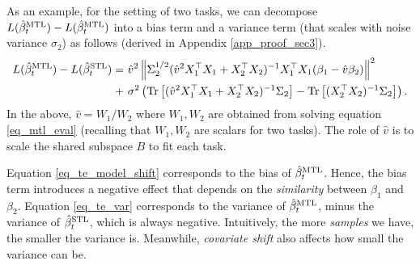 As an example, for the setting of two tasks, we can decompose $L(\hat{\beta}_t^{\text{MTL}}) - L(\hat{\beta}_t^{\text{MTL}})$ into a bias term and a variance term (that scales with noise variance $\sigma_2$) as follows (derived in Appendix \ref{app_proof_sec3}).
{\small\begin{align}
	L(\hat{\beta}_t^{\text{MTL}}) - L(\hat{\beta}_t^{\text{STL}}) =& ~ \hat{v}^2 \left\| \Sigma_2^{1/2} (\hat{v}^2 X_1^{\top}X_1 + X_2^{\top}X_2)^{-1}X_1^{\top}X_1 (\beta_1 - \hat{v}\beta_2) \right\|^2 \label{eq_te_model_shift} \\
	+&~ \sigma^2 \left({\operatorname{Tr}\left[(\hat{v}^2 X_1^{\top}X_1 + X_2^{\top}X_2)^{-1}\Sigma_2\right] - \operatorname{Tr}\left[(X_2^{\top}X_2)^{-1}\Sigma_2\right]}\right). \label{eq_te_var}
\end{align}}%
In the above, $\hat{v} = W_1 / W_2$ where $W_1, W_2$ are obtained from solving equation \eqref{eq_mtl_eval} (recalling that $W_1, W_2$ are scalars for two tasks).
The role of $\hat{v}$ is to scale the shared subspace $B$ to fit each task.

Equation \eqref{eq_te_model_shift} corresponds to the bias of $\hat{\beta}_t^{\text{MTL}}$.
Hence, the bias term introduces a negative effect that depends on the \textit{similarity} between $\beta_1$ and $\beta_2$.
Equation \eqref{eq_te_var} corresponds to the variance of $\hat{\beta}_t^{\text{MTL}}$, minus the variance of $\hat{\beta}_t^{\text{STL}}$, which is always negative.
Intuitively, the more \textit{samples} we have, the smaller the variance is.
Meanwhile, \textit{covariate shift} also affects how small the variance can be.




